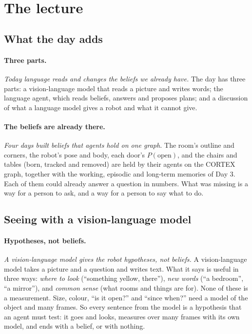 \documentclass[11pt]{article}
\newcommand{\slt}[1]{\emph{#1}}   %
\begin{document}
\section{The lecture}

\subsection{What the day adds}

\paragraph{Three parts.} \slt{Today language reads and changes the beliefs we already have.} The day has three parts: a vision-language model that reads a picture and writes words; the language agent, which reads beliefs, answers and proposes plans; and a discussion of what a language model gives a robot and what it cannot give.

\paragraph{The beliefs are already there.} \slt{Four days built beliefs that agents hold on one graph.} The room's outline and corners, the robot's pose and body, each door's $P(\text{open})$, and the chairs and tables (born, tracked and removed) are held by their agents on the CORTEX graph, together with the working, episodic and long-term memories of Day 3. Each of them could already answer a question in numbers. What was missing is a way for a person to ask, and a way for a person to say what to do.

\subsection{Seeing with a vision-language model}

\paragraph{Hypotheses, not beliefs.} \slt{A vision-language model gives the robot hypotheses, not beliefs.} A vision-language model takes a picture and a question and writes text. What it says is useful in three ways: \emph{where to look} (``something yellow, there''), \emph{new words} (``a bedroom'', ``a mirror''), and \emph{common sense} (what rooms and things are for). None of these is a measurement. Size, colour, ``is it open?'' and ``since when?'' need a model of the object and many frames. So every sentence from the model is a hypothesis that an agent must test: it goes and looks, measures over many frames with its own model, and ends with a belief, or with nothing.
\end{document}
